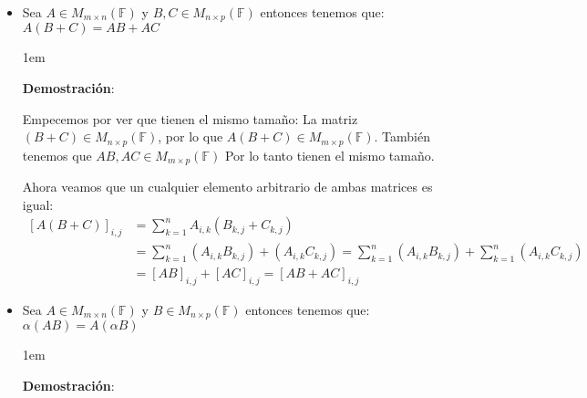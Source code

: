 \documentclass[12pt]{report}                                    %
\newenvironment{SmallIndentation}[1][0.75em]                    %
    {\begin{adjustwidth}{#1}{}\begin{footnotesize}}                 %
    {\end{footnotesize}\end{adjustwidth}}                           %
\begin{document}
                \begin{itemize}

                    \item Sea $A \in M_{m \times n}(\mathbb{F})$ y $B,C \in M_{n \times p}(\mathbb{F})$
                        entonces tenemos que:
                        $A(B+C) = AB+AC$

                        \begin{SmallIndentation}[1em]
                            \textbf{Demostración}:

                            Empecemos por ver que tienen el mismo tamaño:
                            La matriz $(B+C) \in M_{n \times p}(\mathbb{F})$, por lo que 
                            $A(B+C) \in M_{m \times p}(\mathbb{F})$.
                            También tenemos que $AB, AC \in M_{m \times p}(\mathbb{F})$
                            Por lo tanto tienen el mismo tamaño.

                            Ahora veamos que un cualquier elemento arbitrario de ambas matrices es igual:
                            \begin{equation*}
                            \begin{split}
                                [A(B+C)]_{i, j}    
                                    &= \sum_{k=1}^{n} A_{i, k}(B_{k, j}+C_{k, j})  \\            
                                    &= \sum_{k=1}^{n} (A_{i, k}B_{k, j}) + (A_{i, k}C_{k, j}) 
                                    = \sum_{k=1}^{n} (A_{i, k}B_{k, j}) + \sum_{k=1}^{n} (A_{i, k}C_{k, j}) \\
                                    &= [AB]_{i, j} + [AC]_{i, j} = [AB + AC]_{i, j} 
                            \end{split}
                            \end{equation*}

                        \end{SmallIndentation}

                    \item Sea $A \in M_{m \times n}(\mathbb{F})$ y $B \in M_{n \times p}(\mathbb{F})$
                        entonces tenemos que: $\alpha(AB) = A(\alpha B)$

                    \begin{SmallIndentation}[1em]
                        \textbf{Demostración}:


\end{SmallIndentation}
\end{itemize}
\end{document}
